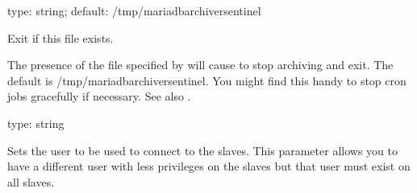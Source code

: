 \documentclass[letterpaper,10pt,english]{sphinxmanual}
\begin{document}

\begin{fulllineitems}
\label{\detokenize{mariadb-archiver:cmdoption-mariadb-archiver-sentinel}}
\sphinxAtStartPar
type: string; default: /tmp/mariadb\sphinxhyphen{}archiver\sphinxhyphen{}sentinel

\sphinxAtStartPar
Exit if this file exists.

\sphinxAtStartPar
The presence of the file specified by {\hyperref[\detokenize{mariadb-archiver:cmdoption-mariadb-archiver-sentinel}]{}} will cause  to
stop archiving and exit.  The default is /tmp/mariadb\sphinxhyphen{}archiver\sphinxhyphen{}sentinel.  You
might find this handy to stop cron jobs gracefully if necessary.  See also
{\hyperref[\detokenize{mariadb-archiver:cmdoption-mariadb-archiver-stop}]{}}.

\end{fulllineitems}


\begin{fulllineitems}
\label{\detokenize{mariadb-archiver:cmdoption-mariadb-archiver-slave-user}}
\sphinxAtStartPar
type: string

\sphinxAtStartPar
Sets the user to be used to connect to the slaves.
This parameter allows you to have a different user with less privileges on the
slaves but that user must exist on all slaves.

\end{fulllineitems}
\end{document}
